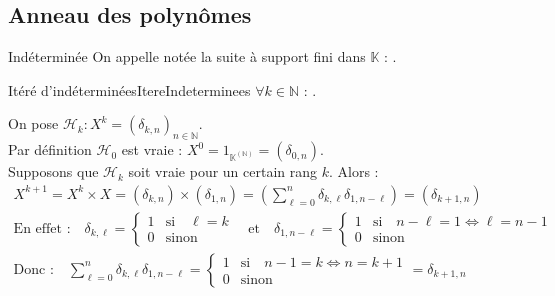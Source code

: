 \documentclass[12pt,a4paper]{report}
\begin{document}
    
    \subsection{Anneau des polynômes}
    
    \begin{definition}{Indéterminée}{}
    On appelle  notée  la suite à support fini dans $\mathbb{K}$ : .
    \end{definition}
    
    
    \begin{proposition}{Itéré d'indéterminées}{ItereIndeterminees}
    $\forall k \in \mathbb{N}$ : .
    \end{proposition}
    
    \begin{demo}
    On pose $\mathcal{H}_k : X^k = (\delta_{k, n})_{n \in \mathbb{N}}$.\\
    Par définition $\mathcal{H}_0$ est vraie : $X^0 = 1_{\mathbb{K}^{(\mathbb{N})}} = (\delta_{0,n})$.\\
    Supposons que $\mathcal{H}_k$ soit vraie pour un certain rang $k$. Alors :
    \begin{gather*}
        X^{k+1} = X^k \times X = (\delta_{k,n}) \times (\delta_{1,n}) = \left(\sum_{\ell = 0}^n \delta_{k,\ell} \delta_{1,n-\ell} \right) = (\delta_{k+1,n}) \\
        \text{En effet :}\quad \delta_{k, \ell} = \left\lbrace \begin{array}{rl} 1 & \text{si}\quad \ell = k \\ 0 & \text{sinon} \end{array} \right. \quad\text{et}\quad \delta_{1, n - \ell} = \left\lbrace \begin{array}{rl} 1 & \text{si} \quad n - \ell = 1 \Leftrightarrow \ell = n -1 \\ 0 & \text{sinon} \end{array} \right. \\
       \text{Donc :}\quad \sum_{\ell = 0}^n \delta_{k,\ell} \delta_{1,n-\ell} = \left\lbrace \begin{array}{rl} 1 & \text{si} \quad n - 1 = k \Leftrightarrow n = k + 1 \\ 0 & \text{sinon} \end{array} \right. = \delta_{k+1,n}
    \end{gather*}
    \end{demo}
    
\end{document}
